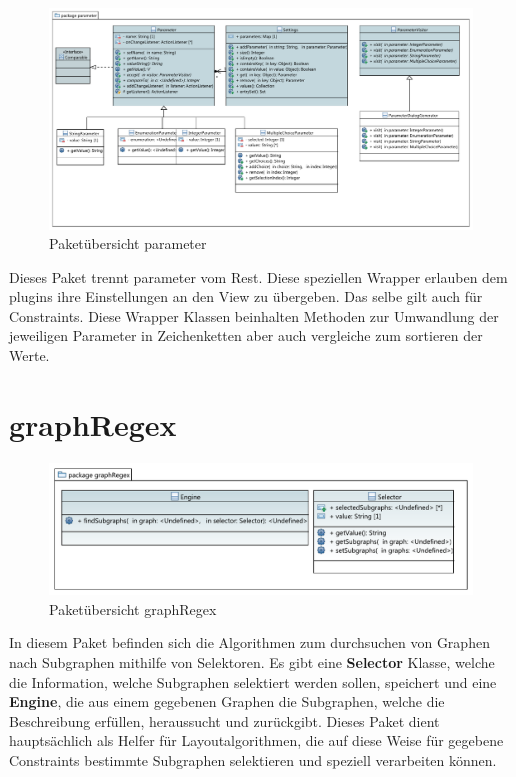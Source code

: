 \begin{figure}[hb]
  \centering
  \includegraphics[width=380pt]{resourcen/parameter.pdf}
  \caption{Paketübersicht parameter}
  \label{fig:packge_parameter}
\end{figure}

Dieses Paket trennt parameter vom Rest. Diese speziellen Wrapper erlauben dem plugins ihre Einstellungen an den View zu übergeben. Das selbe gilt auch für Constraints. Diese Wrapper Klassen beinhalten Methoden zur Umwandlung der jeweiligen Parameter in Zeichenketten aber auch vergleiche zum sortieren der Werte.

\newpage

\section{graphRegex}

\begin{figure}[hb]
  \centering
  \includegraphics[width=380pt]{resourcen/graphRegex.pdf}
  \caption{Paketübersicht graphRegex}
  \label{fig:packge_graphRegex}
\end{figure}

In diesem Paket befinden sich die Algorithmen zum durchsuchen von Graphen nach Subgraphen mithilfe von Selektoren. Es gibt eine \textbf{Selector} Klasse, welche die Information, welche Subgraphen selektiert werden sollen, speichert und eine \textbf{Engine}, die aus einem gegebenen Graphen die Subgraphen, welche die Beschreibung erfüllen, heraussucht und zurückgibt. Dieses Paket dient hauptsächlich als Helfer für Layoutalgorithmen, die auf diese Weise für gegebene Constraints bestimmte Subgraphen selektieren und speziell verarbeiten können.

